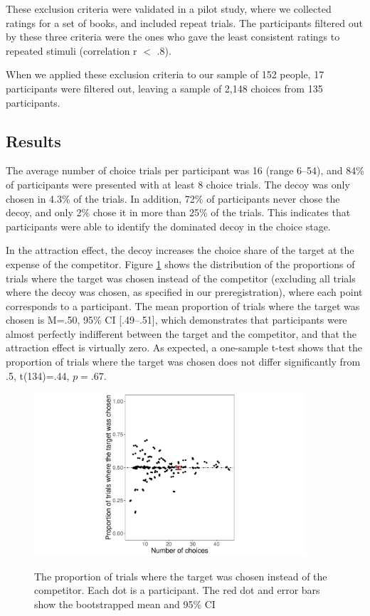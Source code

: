 \documentclass[12pt, a4paper]{article}
\begin{document}
These exclusion criteria were validated in a pilot study, where we collected ratings for a set of books, and included repeat trials. The participants filtered out by these three criteria were the ones who gave the least consistent ratings to repeated stimuli (correlation r $<$ .8).

When we applied these exclusion criteria to our sample of 152 people, 17 participants were filtered out, leaving a sample of 2,148 choices from 135 participants.


\subsection*{Results}

The average number of choice trials per participant was 16 (range 6--54), and 84\% of participants were presented with at least 8 choice trials. The decoy was only chosen in 4.3\% of the trials. In addition, 72\% of participants never chose the decoy, and only 2\% chose it in more than 25\% of the trials. This indicates that participants were able to identify the dominated decoy in the choice stage.

In the attraction effect, the decoy increases the choice share of the target at the expense of the competitor. Figure \ref{fig:exp2_res} shows the distribution of the proportions of trials where the target was chosen instead of the competitor (excluding all trials where the decoy was chosen, as specified in our preregistration), where each point corresponds to a participant. The mean proportion of trials where the target was chosen is M=.50, 95\% CI [.49--.51], which demonstrates that participants were almost perfectly indifferent between the target and the competitor, and that the attraction effect is virtually zero. As expected, a one-sample t-test shows that the proportion of trials where the target was chosen does not differ significantly from .5, t(134)=.44, $p=.67$.

\begin{figure}[htb!]
\centering
\captionsetup{justification=centering}
\caption{The proportion of trials where the target was chosen instead of the competitor. Each dot is a participant. The red dot and error bars show the bootstrapped mean and 95\% CI}
\includegraphics[width=0.9\textwidth]{figure4.pdf}
\label{fig:exp2_res}
\end{figure}
\end{document}
